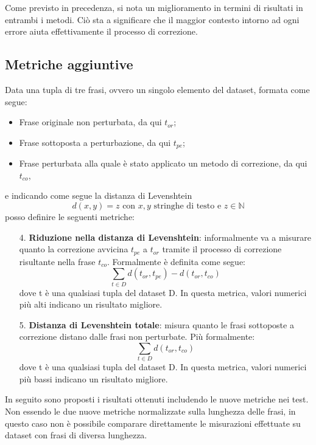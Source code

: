 \documentclass[12pt]{article}
\begin{document}
Come previsto in precedenza, si nota un miglioramento in termini di risultati in entrambi i metodi. Ciò sta a significare che il maggior contesto intorno ad ogni errore aiuta effettivamente il processo di correzione.

\subsection{Metriche aggiuntive}
Data una tupla di tre frasi, ovvero un singolo elemento del dataset, formata come segue:
\begin{itemize}
\item Frase originale non perturbata, da qui $t_{or}$;
\item Frase sottoposta a perturbazione, da qui $t_{pe}$;
\item Frase perturbata alla quale è stato applicato un metodo di correzione, da qui $t_{co}$,
\end{itemize}
e indicando come segue la distanza di Levenshtein
\begin{equation}
d(x,y) = z \text{ con } x,y \text{ stringhe di testo e } z \in \mathbb{N}
\end{equation}
posso definire le seguenti metriche:

\begin{itemize}
\item [4.] \textbf{Riduzione nella distanza di Levenshtein}: informalmente va a misurare quanto la correzione avvicina $t_{pe}$ a $t_{or}$ tramite il processo di correzione risultante nella frase $t_{co}$. Formalmente è definita come segue:
\begin{equation}
\sum_{t \in D}d(t_{or},t_{pe}) - d(t_{or},t_{co})
\end{equation}
dove t è una qualsiasi tupla del dataset D. In questa metrica, valori numerici più alti indicano un risultato migliore.

\item [5.] \textbf{Distanza di Levenshtein totale}: misura quanto le frasi sottoposte a correzione distano dalle frasi non perturbate. Più formalmente:
\begin{equation}
\sum_{t \in D}d(t_{or},t_{co})
\end{equation}
dove t è una qualsiasi tupla del dataset D. In questa metrica, valori numerici più bassi indicano un risultato migliore.

\end{itemize}

In seguito sono proposti i risultati ottenuti includendo le nuove metriche nei test. Non essendo le due nuove metriche normalizzate sulla lunghezza delle frasi, in questo caso non è possibile comparare direttamente le misurazioni effettuate su dataset con frasi di diversa lunghezza.
\end{document}
